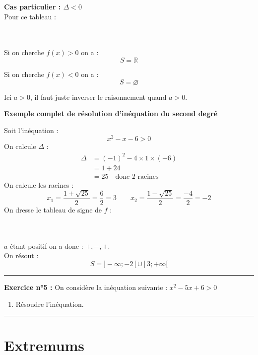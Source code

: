 \documentclass{article} %
\begin{document}
	\textbf{Cas particulier : $\Delta < 0$}\\
	Pour ce tableau : \\\\
	\\
	
	\noindent Si on cherche $f(x) > 0$ on a :
	\[
	S = \mathbb{R}
	\]
	
	\noindent Si on cherche $f(x) < 0$ on a :
	\[
	S = \varnothing
	\]
	
	\noindent Ici $a > 0$, il faut juste inverser le raisonnement quand $a > 0$.\\
	
	\newpage
	
	\textbf{Exemple complet de résolution d'inéquation du second degré}
	
	\noindent Soit l'inéquation : 
	\[
	x^2 - x - 6 > 0
	\]
	On calcule $\Delta$ :
	\begin{align*}
		\Delta &= (-1)^2 - 4\times1\times(-6)  \\
		&= 1 + 24 \\
		&= 25 \quad \text{donc 2 racines}
	\end{align*}
	On calcule les racines :
	\[
	x_1 = \frac{1 + \sqrt{25}}{2} = \frac{6}{2} = 3 \quad \quad x_2 = \frac{1 - \sqrt{25}}{2} = \frac{-4}{2} = -2
	\]
	On dresse le tableau de signe de $f$ : \\\\
	\\
	$a$ étant positif on a donc : $+, -, +$.\\
	
	\noindent On résout :
	\[
	S = ]-\infty;-2[ \cup ]3;+\infty[
	\]
	
	\rule{\textwidth}{0.4pt}
	\noindent \textbf{Exercice n°5 :}
	On considère la inéquation suivante : $x^2 - 5x + 6 > 0$
	\begin{enumerate}
	\item Résoudre l'inéquation.
	\end{enumerate}
	
	\rule{\textwidth}{0.4pt}
	\newpage
	\section{Extremums}
\end{document}
